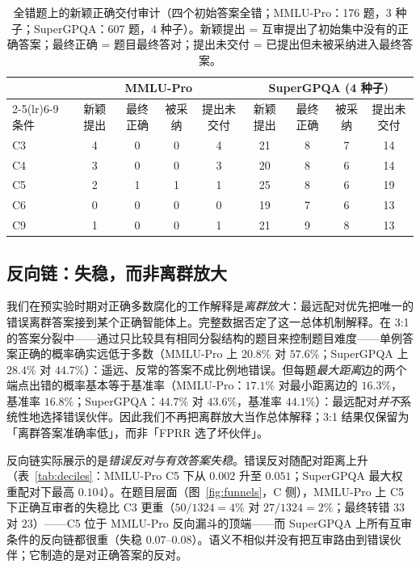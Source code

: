 \documentclass[UTF8,11pt]{ctexart}
\begin{document}
\begin{table}[t]
\centering
\small
\caption{全错题上的新颖正确交付审计（四个初始答案全错；MMLU-Pro：176 题，3 种子；SuperGPQA：607 题，4 种子）。新颖提出 = 互审提出了初始集中没有的正确答案；最终正确 = 题目最终答对；提出未交付 = 已提出但未被采纳进入最终答案。}
\label{tab:delivery}
\begin{tabular}{lcccccccc}
\toprule
 & \multicolumn{4}{c}{MMLU-Pro} & \multicolumn{4}{c}{SuperGPQA (4 种子)} \\
\cmidrule(lr){2-5}\cmidrule(lr){6-9}
条件 & 新颖提出 & 最终正确 & 被采纳 & 提出未交付 & 新颖提出 & 最终正确 & 被采纳 & 提出未交付 \\
\midrule
C3 & 4 & 0 & 0 & 4 & 21 & 8 & 7 & 14 \\
C4 & 3 & 0 & 0 & 3 & 20 & 8 & 6 & 14 \\
C5 & 2 & 1 & 1 & 1 & 25 & 8 & 6 & 19 \\
C6 & 0 & 0 & 0 & 0 & 19 & 7 & 6 & 13 \\
C9 & 1 & 0 & 0 & 1 & 21 & 9 & 8 & 13 \\
\bottomrule
\end{tabular}
\end{table}

\subsection{反向链：失稳，而非离群放大}
\label{sec:rev}

我们在预实验时期对正确多数腐化的工作解释是\emph{离群放大}：最远配对优先把唯一的错误离群答案接到某个正确智能体上。完整数据否定了这一总体机制解释。在 3:1 的答案分裂中——通过只比较具有相同分裂结构的题目来控制题目难度——单例答案正确的概率确实远低于多数（MMLU-Pro 上 $20.8\%$ 对 $57.6\%$；SuperGPQA 上 $28.4\%$ 对 $44.7\%$）：遥远、反常的答案不成比例地错误。但每题\emph{最大距离}边的两个端点出错的概率基本等于基准率（MMLU-Pro：$17.1\%$ 对最小距离边的 $16.3\%$，基准率 $16.8\%$；SuperGPQA：$44.7\%$ 对 $43.6\%$，基准率 $44.1\%$）：最远配对\emph{并不}系统性地选择错误伙伴。因此我们不再把离群放大当作总体解释；3:1 结果仅保留为「离群答案准确率低」，而非「FPRR 选了坏伙伴」。

反向链实际展示的是\emph{错误反对与有效答案失稳}。错误反对随配对距离上升（表~\ref{tab:deciles}：MMLU-Pro C5 下从 $0.002$ 升至 $0.051$；SuperGPQA 最大权重配对下最高 $0.104$）。在题目层面（图~\ref{fig:funnels}，C 侧），MMLU-Pro 上 C5 下正确互审者的失稳比 C3 更重（$50/1324 = 4\%$ 对 $27/1324 = 2\%$；最终转错 $33$ 对 $23$）——C5 位于 MMLU-Pro 反向漏斗的顶端——而 SuperGPQA 上所有互审条件的反向链都很重（失稳 $0.07$--$0.08$）。语义不相似并没有把互审路由到错误伙伴；它制造的是对正确答案的反对。
\end{document}
